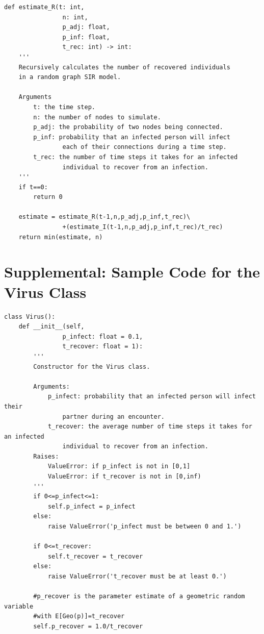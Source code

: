 \documentclass[psamsfonts]{amsart}
\theoremstyle{definition}
\theoremstyle{remark}
\numberwithin{equation}{section}
\begin{document}
\begin{verbatim}  
def estimate_R(t: int,
                n: int,
                p_adj: float,
                p_inf: float,
                t_rec: int) -> int:
    '''
    Recursively calculates the number of recovered individuals
    in a random graph SIR model.
    
    Arguments
    	t: the time step.
    	n: the number of nodes to simulate.
    	p_adj: the probability of two nodes being connected.
    	p_inf: probability that an infected person will infect
                each of their connections during a time step.
    	t_rec: the number of time steps it takes for an infected
                individual to recover from an infection.
    '''
    if t==0:
        return 0
    
    estimate = estimate_R(t-1,n,p_adj,p_inf,t_rec)\
                +(estimate_I(t-1,n,p_adj,p_inf,t_rec)/t_rec)
    return min(estimate, n)
\end{verbatim}

\pagebreak

\section{Supplemental: Sample Code for the Virus Class}

\begin{verbatim}
class Virus():
    def __init__(self,
                p_infect: float = 0.1,
                t_recover: float = 1):
        '''
        Constructor for the Virus class.

        Arguments:
            p_infect: probability that an infected person will infect their
                partner during an encounter.
            t_recover: the average number of time steps it takes for an infected
                individual to recover from an infection.
        Raises:
            ValueError: if p_infect is not in [0,1]
            ValueError: if t_recover is not in [0,inf)
        '''
        if 0<=p_infect<=1:
            self.p_infect = p_infect
        else:
            raise ValueError('p_infect must be between 0 and 1.')

        if 0<=t_recover:
            self.t_recover = t_recover
        else:
            raise ValueError('t_recover must be at least 0.')

        #p_recover is the parameter estimate of a geometric random variable
        #with E[Geo(p)]=t_recover
        self.p_recover = 1.0/t_recover
\end{verbatim}
\end{document}
